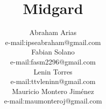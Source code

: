 \documentclass[twocolumn]{IEEEtran}
\begin{document}
\title{Midgard}







 


\author{Abraham Arias\\
        e-mail:ipseabraham@gmail.com\\
        Fabian Solano\\
        e-mail:fasm2296@gmail.com\\
        Lenin Torres\\
        e-mail:ttvleninn@gmail.com\\
        Mauricio Montero Jiménez\\
        e-mail:maumonteroj@gmail.com\\
}
\end{document}
